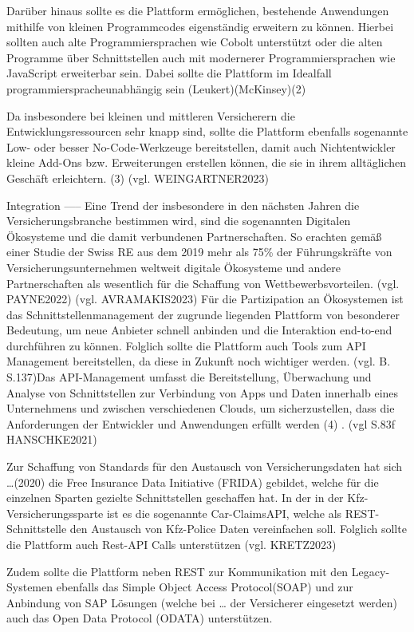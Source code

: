 Darüber hinaus sollte es die Plattform ermöglichen, bestehende Anwendungen mithilfe von kleinen Programmcodes eigenständig erweitern zu können. Hierbei sollten auch alte Programmiersprachen wie Cobolt unterstützt oder die alten Programme über Schnittstellen auch mit modernerer Programmiersprachen wie JavaScript erweiterbar sein. Dabei sollte die Plattform im Idealfall programmierspracheunabhängig sein (Leukert)(McKinsey)(2)

Da insbesondere bei kleinen und mittleren Versicherern die Entwicklungsressourcen sehr knapp sind, sollte die Plattform ebenfalls sogenannte Low- oder besser No-Code-Werkzeuge bereitstellen, damit auch Nichtentwickler kleine Add-Ons bzw. Erweiterungen erstellen können, die sie in ihrem alltäglichen Geschäft erleichtern. (3) (vgl. WEINGARTNER2023)



Integration ----- Eine Trend der insbesondere in den nächsten Jahren die Versicherungsbranche bestimmen wird, sind die sogenannten Digitalen Ökosysteme und die damit verbundenen Partnerschaften. So erachten gemäß einer Studie der Swiss RE aus dem 2019 mehr als 75\% der Führungskräfte von Versicherungsunternehmen weltweit digitale Ökosysteme und andere Partnerschaften als wesentlich für die Schaffung von Wettbewerbsvorteilen. (vgl. PAYNE2022) (vgl. AVRAMAKIS2023) Für die Partizipation an Ökosystemen ist das Schnittstellenmanagement der zugrunde liegenden Plattform von besonderer Bedeutung, um neue Anbieter schnell anbinden und die Interaktion end-to-end durchführen zu können. Folglich sollte die Plattform auch Tools zum API Management bereitstellen, da diese in Zukunft noch wichtiger werden. (vgl. B. S.137)Das API-Management umfasst die Bereitstellung, Überwachung und Analyse von Schnittstellen zur Verbindung von Apps und Daten innerhalb eines Unternehmens und zwischen verschiedenen Clouds, um sicherzustellen, dass die Anforderungen der Entwickler und Anwendungen erfüllt werden (4) . (vgl S.83f HANSCHKE2021)

Zur Schaffung von Standards für den Austausch von Versicherungsdaten hat sich …(2020) die Free Insurance Data Initiative (FRIDA) gebildet, welche für die einzelnen Sparten gezielte Schnittstellen geschaffen hat. In der in der Kfz-Versicherungssparte ist es die sogenannte Car-ClaimsAPI, welche als REST-Schnittstelle den Austausch von Kfz-Police Daten vereinfachen soll. Folglich sollte die Plattform auch Rest-API Calls unterstützen (vgl. KRETZ2023)

Zudem sollte die Plattform neben REST zur Kommunikation mit den Legacy-Systemen ebenfalls das Simple Object Access Protocol(SOAP) und zur Anbindung von SAP Lösungen (welche bei … der Versicherer eingesetzt werden) auch das Open Data Protocol (ODATA) unterstützen.

